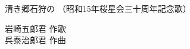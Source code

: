 \documentclass[10pt,b5j]{tarticle} %
\begin{document}
\begin{minipage}[c]{0.7\hsize} %
    \begin{center}
        {\LARGE
            清き郷石狩の %
        }
        {\small 
            （昭和15年桜星会三十周年記念歌） %
        }
    \end{center}
\end{minipage}
\begin{minipage}[c]{0.3\hsize} %
    \begin{flushright} %
        岩崎五郎君 作歌\\呉泰治郎君 作曲 %
    \end{flushright}
\end{minipage}
\end{document}
